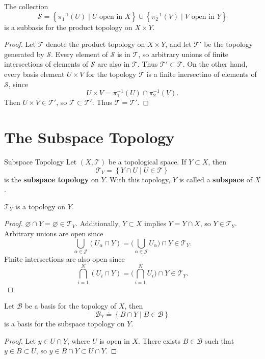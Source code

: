 \documentclass[10pt]{report}
\begin{document}
\begin{thrm}{}{}
The collection
\[
	\mathcal{S}=\left\{ \pi_1^{-1}(U) \;|\; U \text{ open in } X \right\} \cup \left\{ \pi_2^{-1}(V) \;|\; V \text{ open in } Y \right\}
\] is a subbasis for the product topology on $X \times Y$.
\end{thrm}
\begin{proof}
	Let $\mathcal{T}$ denote the product topology on $X \times Y$, and let $\mathcal{T}'$ be the topology generated by $\mathcal{S}$. Every element of $\mathcal{S}$ is in $\mathcal{T}$, so arbitrary unions of finite intersections of elements of $\mathcal{S}$ are also in $\mathcal{T}$. Thus $\mathcal{T}' \subset \mathcal{T}$. On the other hand, every basis element $U \times V$ for the topology $\mathcal{T}$ is a finite inersectino of elements of $\mathcal{S}$, since
	\[
		U \times V = \pi_1^{-1}(U) \cap \pi_2^{-1}(V).
	\] Then $U \times V \in \mathcal{T}'$, so $\mathcal{T}\subset \mathcal{T}'$. Thus $\mathcal{T}=\mathcal{T}'$.
\end{proof}


\section{The Subspace Topology}

\begin{defn}{Subspace Topology}{}
	Let $(X,\mathcal{T})$ be a topological space. If $Y \subset X$, then
	\[
	\mathcal{T}_Y = \left\{ Y \cap U \;|\; U \in \mathcal{T} \right\}
	\] is the \textbf{subspace topology} on $Y$. With this topology, $Y$ is called a \textbf{subspace} of $X$.
\end{defn}

\begin{prop}
	$\mathcal{T}_Y$ is a topology on $Y$.
\end{prop}
\begin{proof}
	$\varnothing \cap Y = \varnothing \in \mathcal{T}_Y$. Additionally, $Y \subset X$ implies $Y = Y \cap X$, so $Y \in \mathcal{T}_Y$. Arbitrary unions are open since
	\[
		\bigcup_{\alpha\in\mathcal{J}}(U_\alpha \cap Y) = \bigg( \bigcup_{\alpha\in\mathcal{J}}U_\alpha \bigg) \cap Y \in \mathcal{T}_Y.
	\] 
	Finite intersections are also open since
	\[
		\bigcap_{i=1}^N (U_i \cap Y) = \bigg( \bigcap_{i=1}^N U_i \bigg) \cap Y \in \mathcal{T}_Y.
	\] 
\end{proof}

\begin{prop}
Let $\mathcal{B}$ be a basis for the topology of $X$, then \[\mathcal{B}_Y \doteq \left\{ B \cap Y \;|\; B \in \mathcal{B} \right\}\] is a basis for the subspace topology on $Y$.
\end{prop}
\begin{proof}
	Let $y \in U \cap Y$, where $U$ is open in $X$. There exists $B \in \mathcal{B}$ such that $y \in B \subset U$, so $y \in B \cap Y \subset U \cap Y$.
\end{proof}
\end{document}
